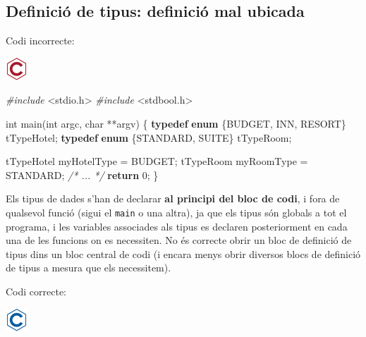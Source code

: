 \documentclass[
]{book}
\newenvironment{Shaded}{\begin{snugshade}}{\end{snugshade}}
\newcommand{\CommentTok}[1]{\textcolor[rgb]{0.56,0.35,0.01}{\textit{#1}}}
\newcommand{\ControlFlowTok}[1]{\textcolor[rgb]{0.13,0.29,0.53}{\textbf{#1}}}
\newcommand{\DataTypeTok}[1]{\textcolor[rgb]{0.13,0.29,0.53}{#1}}
\newcommand{\DecValTok}[1]{\textcolor[rgb]{0.00,0.00,0.81}{#1}}
\newcommand{\ImportTok}[1]{#1}
\newcommand{\KeywordTok}[1]{\textcolor[rgb]{0.13,0.29,0.53}{\textbf{#1}}}
\newcommand{\NormalTok}[1]{#1}
\newcommand{\PreprocessorTok}[1]{\textcolor[rgb]{0.56,0.35,0.01}{\textit{#1}}}
\begin{document}
\hypertarget{definiciuxf3-de-tipus-definiciuxf3-mal-ubicada}{%
\subsection{Definició de tipus: definició mal ubicada}\label{definiciuxf3-de-tipus-definiciuxf3-mal-ubicada}}

Codi incorrecte:

\includegraphics{./img/c_err.png}

\begin{Shaded}
\begin{Highlighting}[]
\PreprocessorTok{\#include }\ImportTok{\textless{}stdio.h\textgreater{}}
\PreprocessorTok{\#include }\ImportTok{\textless{}stdbool.h\textgreater{}}

\DataTypeTok{int}\NormalTok{ main(}\DataTypeTok{int}\NormalTok{ argc, }\DataTypeTok{char}\NormalTok{ **argv) \{}
    \KeywordTok{typedef} \KeywordTok{enum}\NormalTok{ \{BUDGET, INN, RESORT\} tTypeHotel;}
    \KeywordTok{typedef} \KeywordTok{enum}\NormalTok{ \{STANDARD, SUITE\} tTypeRoom;}

\NormalTok{    tTypeHotel myHotelType = BUDGET;}
\NormalTok{    tTypeRoom myRoomType = STANDARD;}
    \CommentTok{/* ... */}
    \ControlFlowTok{return} \DecValTok{0}\NormalTok{;}
\NormalTok{\}}
\end{Highlighting}
\end{Shaded}

Els tipus de dades s'han de declarar \textbf{al principi del bloc de codi}, i fora de qualsevol funció (sigui el \texttt{main} o una altra), ja que els tipus són globals a tot el programa, i les variables associades als tipus es declaren posteriorment en cada una de les funcions on es necessiten. No és correcte obrir un bloc de definició de tipus dins un bloc central de codi (i encara menys obrir diversos blocs de definició de tipus a mesura que els necessitem).

Codi correcte:

\includegraphics{./img/c.png}
\end{document}
